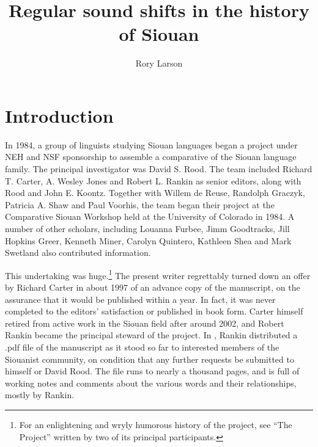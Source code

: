 \documentclass[output=paper]{LSP/langsci}
\author{Rory Larson}
\title{Regular sound shifts in the history of {Siouan}}
\begin{document}
\section{Introduction}  
In 1984, a group of linguists studying Siouan languages began a  project under NEH and NSF sponsorship to assemble a comparative  of the Siouan language family.  The principal investigator was David S. Rood. The team included Richard T. Carter, A. Wesley Jones and Robert L. Rankin as senior editors, along with Rood and John E. Koontz.  Together with Willem de Reuse, Randolph Graczyk, Patricia A. Shaw and Paul Voorhis, the  team began their project at the Comparative Siouan Workshop held at the University of Colorado in 1984.  A number of other scholars, including Louanna Furbee, Jimm Goodtracks, Jill Hopkins Greer, Kenneth Miner, Carolyn Quintero, Kathleen Shea and Mark Swetland also contributed information.

This undertaking was huge.\footnote{For an enlightening and wryly humorous history of the project, see ``The  Project'' \citep{RoodKoontz2002} written by two of its principal participants.} The present writer regrettably turned down an offer by Richard Carter in about 1997 of an advance copy of the  manuscript, on the assurance that it would be published within a year.  In fact, it was never completed to the editors' satisfaction or published in book form. Carter himself retired from active work in the Siouan field after around 2002, and Robert Rankin became the principal steward of the project.  In \citeyear{Rankinetal2006PDF}, Rankin distributed a .pdf file of the manuscript as it stood so far to interested members of the Siouanist community, on condition that any further requests be submitted to himself or David Rood.  The file runs to nearly a thousand pages, and is full of working notes and comments about the various words and their relationships, mostly by Rankin.
\end{document}
